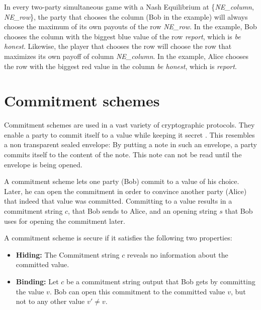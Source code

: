 \documentclass{cacthesis}
\begin{document}
In every two-party simultaneous game with a Nash Equilibrium at \{\emph{NE\_column}, \emph{NE\_row}\}, the party that chooses the column (Bob in the example) will always choose the maximum of its own payouts of the row \emph{NE\_row}. In the example, Bob chooses the column with the biggest blue value of the row \emph{report}, which is \emph{be honest}. Likewise, the player that chooses the row will choose the row that maximizes its own payoff of column \emph{NE\_column}. In the example, Alice chooses the row with the biggest red value in the column \emph{be honest}, which is \emph{report}.


\section{Commitment schemes}
Commitment schemes are used in a vast variety of cryptographic protocols. They enable a party to commit itself to a value while keeping it secret \cite{Goldreich2001-bv}. This resembles a non transparent sealed envelope: By putting a note in such an envelope, a party commits itself to the content of the note. This note can not be read until the envelope is being opened.\newline

 A commitment scheme lets one party (Bob) commit to a value of his choice. Later, he can open the commitment in order to convince another party (Alice) that indeed that value was committed. Committing to a value results in a commitment string $c$, that Bob sends to Alice, and an opening string $s$ that Bob uses for opening the commitment later\cite{boneh_graduate_nodate}.\newline
 
 A commitment scheme is secure if it satisfies the following two properties:
 \begin{itemize}
     \item \textbf{Hiding:} The Commitment string $c$ reveals no information about the committed value\cite{boneh_graduate_nodate}.
     \item \textbf{Binding:} Let $c$ be a commitment string output that Bob gets by committing the value $v$. Bob can open this commitment to the committed value $v$, but not to any other value $v'\neq v$.
 \end{itemize}
\end{document}
